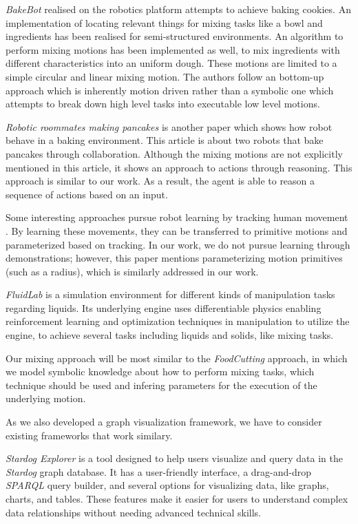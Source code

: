 \textit{BakeBot} \cite{Bollini2011BakebotBC} realised on the \textit{}  robotics platform attempts to achieve baking cookies. An implementation of locating relevant things for mixing tasks
like a bowl and ingredients has been realised for semi-structured environments. An algorithm to perform mixing motions has been implemented as well, to mix 
ingredients with different characteristics into an uniform dough. These motions are limited to a simple circular and linear mixing motion.
The authors follow an bottom-up approach which is inherently motion driven rather than a
symbolic one which attempts to break down high level tasks into executable low level motions. 

\textit{Robotic roommates making pancakes} \cite{beetzrrmp} is another paper which shows how robot behave in a baking environment. 
This article is about two robots that bake pancakes through collaboration. 
Although the mixing motions are not explicitly mentioned in this article, it shows an approach to actions through reasoning. 
This approach is similar to our work. As a result, the agent is able to reason a sequence of actions based on an input.

Some interesting approaches pursue robot learning by tracking human movement \cite{10.1007/978-3-030-95892-3_22}. By learning these movements, they can be transferred to primitive motions and parameterized based on tracking.
In our work, we do not pursue learning through demonstrations; however, this paper mentions parameterizing motion primitives (such as a radius), which is similarly addressed in our work.
 
\textit{FluidLab} \cite{xian2023fluidlab} is a simulation environment for different kinds of manipulation tasks regarding liquids. Its underlying engine uses differentiable physics 
enabling reinforcement learning and optimization techniques in manipulation to utilize the engine, to achieve several tasks 
including liquids and solids, like mixing tasks. 

Our mixing approach will be most similar to the \textit{FoodCutting} approach, in which we model symbolic knowledge about how to perform
mixing tasks, which technique should be used and infering parameters for the execution of the underlying motion.

As we also developed a graph visualization framework, we have to consider existing frameworks that work similary.

\textit{Stardog Explorer} \cite{StardogExplorer} is a tool designed to help users visualize and query data in the \textit{Stardog} graph database. It has a user-friendly interface, a drag-and-drop \textit{SPARQL} query builder, and several options for visualizing data, like graphs, charts, and tables. These features make it easier for users to understand complex data relationships without needing advanced technical skills.

